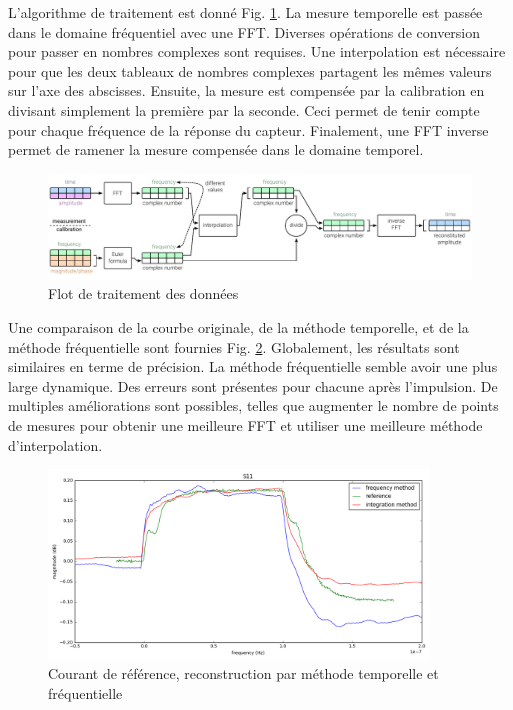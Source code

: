 L'algorithme de traitement est donné Fig. \ref{fig:postprocess-nfs-pipeline}.
La mesure temporelle est passée dans le domaine fréquentiel avec une FFT.
Diverses opérations de conversion pour passer en nombres complexes sont requises.
Une interpolation est nécessaire pour que les deux tableaux de nombres complexes partagent les mêmes valeurs sur l'axe des abscisses.
Ensuite, la mesure est compensée par la calibration en divisant simplement la première par la seconde.
Ceci permet de tenir compte pour chaque fréquence de la réponse du capteur.
Finalement, une FFT inverse permet de ramener la mesure compensée dans le domaine temporel.

\begin{figure}[!h]
  \centering
  \includegraphics[width=\textwidth]{src/1/figures/frequency_post_process_flow.pdf}
  \caption{Flot de traitement des données}
  \label{fig:postprocess-nfs-pipeline}
\end{figure}

Une comparaison de la courbe originale, de la méthode temporelle, et de la méthode fréquentielle sont fournies Fig. \ref{fig:freq-domain-reconstructed}.
Globalement, les résultats sont similaires en terme de précision.
La méthode fréquentielle semble avoir une plus large dynamique.
Des erreurs sont présentes pour chacune après l'impulsion.
De multiples améliorations sont possibles, telles que augmenter le nombre de points de mesures pour obtenir une meilleure FFT et utiliser une meilleure méthode d'interpolation.

\begin{figure}[!h]
  \centering
  \includegraphics[width=0.9\textwidth]{src/1/figures/final_comparison_reconstructions.png}
  \caption{Courant de référence, reconstruction par méthode temporelle et fréquentielle}
  \label{fig:freq-domain-reconstructed}
\end{figure}
